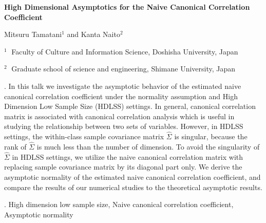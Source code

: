 \documentclass[12pt]{article}
\begin{document}
\begin{flushleft}


{\Large\bf High Dimensional Asymptotics for the Naive Canonical Correlation Coefficient}


\vspace{1.0cm}

Mitsuru Tamatani$^1$ and Kanta Naito$^2$

\begin{description}

\item $^1 \;$ Faculty of Culture and Information Science, Doshisha University, Japan

\item $^2 \;$ Graduate school of science and engineering, Shimane University, Japan

\end{description}

\end{flushleft}


\vspace{0.75cm}

. 
In this talk we investigate the asymptotic behavior of the estimated naive canonical correlation coefficient under the normality assumption and High Dimension Low Sample Size (HDLSS) settings.
In general, canonical correlation matrix is associated with canonical correlation analysis which is useful in studying the relationship between two sets of variables.
However, in HDLSS settings, the within-class sample covariance matrix $\hat{\Sigma}$ is singular, because the rank of $\hat{\Sigma}$ is much less than the number of dimension.
To avoid the singularity of $\hat{\Sigma}$ in HDLSS settings,
we utilize the naive canonical correlation matrix with replacing sample covariance matrix by its diagonal
part only. 
We derive the asymptotic normality of the estimated naive canonical correlation coefficient, and compare the results of our numerical studies to the theoretical asymptotic results.

\vskip 2mm

.
High dimension low sample size, Naive canonical correlation coefficient, Asymptotic normality
\end{document}
